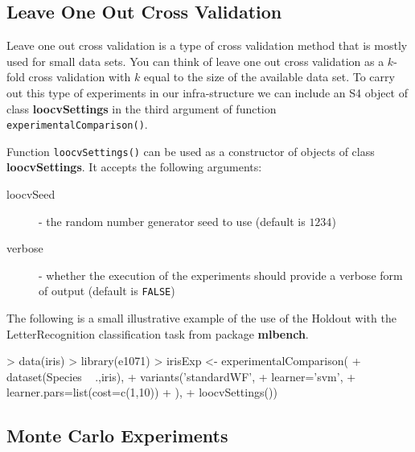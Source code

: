 \documentclass[10pt,a4paper]{article}
\begin{document}
\subsection{Leave One Out Cross Validation}

Leave one out cross validation is a type of cross validation method
that is mostly used for small data sets. You can think of leave one
out cross validation as a $k$-fold cross validation with $k$ equal to
the size of the available data set. To carry out this type of
experiments in our infra-structure we can include an S4 object of
class \textbf{loocvSettings} in the third argument of function
\texttt{experimentalComparison()}.

Function \texttt{loocvSettings()} can be used as a constructor of
objects of class \textbf{loocvSettings}. It accepts the following
arguments:

\begin{description}
\item[loocvSeed] - the random number generator seed to use (default is $1234$)
\item[verbose] - whether the execution of the experiments should provide a verbose form of output (default is \texttt{FALSE})
\end{description}


The following is a small illustrative example of the use of the
Holdout with the LetterRecognition classification task from package
\textbf{mlbench}.

\begin{Schunk}
\begin{Sinput}
> data(iris)
> library(e1071)
> irisExp <- experimentalComparison(
+   dataset(Species ~ .,iris),
+   variants('standardWF',
+            learner='svm',
+            learner.pars=list(cost=c(1,10))
+            ),
+   loocvSettings())
\end{Sinput}
\end{Schunk}
\subsection{Monte Carlo Experiments}
\end{document}
